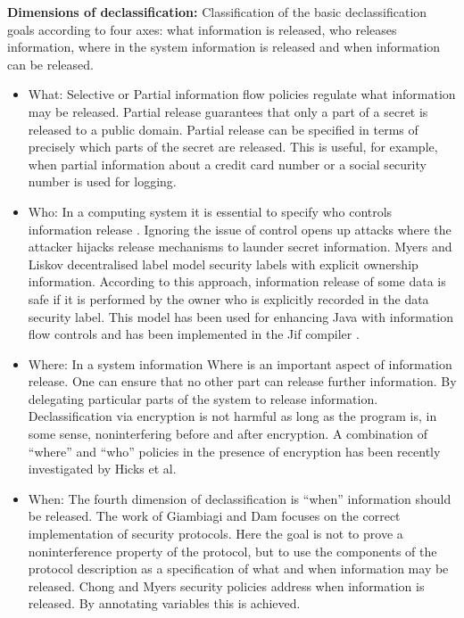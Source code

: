 \textbf{Dimensions of declassification:}
Classification of the basic declassification goals according to four axes: what information is released, who releases information, where in the system information is released and when information can be released.
\begin{itemize}
   \item What: Selective or Partial information flow policies \cite{ref_67_cohen1977information,ref_6_cohen1978information,ref_8_giacobazzi2005adjoining,ref_7_joshi2000semantic} regulate what
   information may be released. Partial release guarantees that only a part of a secret is
   released to a public domain. Partial release can be specified in terms of precisely which
   parts of the secret are released. This is useful,
   for example, when partial information about a credit card number or a social security number is used for logging.
   
   \item Who: In a computing system it is essential to specify who controls information release .
   Ignoring the issue of control opens up attacks where the attacker hijacks release
   mechanisms to launder secret information. Myers and Liskov decentralised label
   model \cite{ref_9_myers1997decentralized} security labels with explicit ownership information. According to this approach, information release of some data is safe if it is performed by the
   owner who is explicitly recorded in the data security label. This model has been used for enhancing Java with information flow controls \cite{ref_10_myers1999jflow} and has been implemented in
   the Jif compiler \cite{ref_11_myers2001jif}.
   
   \item Where: In a system information  Where is an important aspect of information release. One can ensure that no other  part can release further information. By delegating particular parts of the system to release information. Declassification
   via encryption is not harmful as long as the program is, in some sense, noninterfering
   before and after encryption.  A combination of \enquote{where} and \enquote{who} policies in the presence of encryption has
   been recently investigated by Hicks et al. \cite{ref_12_hicks2005declassification}
   
   \item When: The fourth dimension of declassification is  \enquote{when} information should be released. The work of Giambiagi and Dam \cite{ref_19_giambiagi2003secure} focuses on the correct implementation of security protocols. Here the goal is not to prove a noninterference property of the protocol, but to use the components of the protocol description as a specification of what and when information may be released. Chong and Myers security policies \cite{ref_13_chong2004security} address when information is released. By annotating variables this is achieved.
   
\end{itemize}

